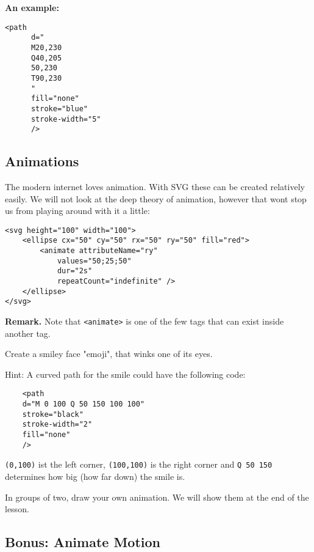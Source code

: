 \documentclass[english,11pt,a4paper]{report}
\begin{document}
{\bf An example:}
\begin{multicols}{2}
\begin{lstlisting}
<path 
      d="
      M20,230 
      Q40,205 
      50,230 
      T90,230
      " 
      fill="none" 
      stroke="blue" 
      stroke-width="5"
      />
\end{lstlisting}
\columnbreak

\end{multicols}

\newpage
\subsection{Animations}
The modern internet loves animation. With SVG these can be created relatively easily. We will not look at the deep theory of animation, however that wont stop us from playing around with it a little:

\begin{lstlisting}
<svg height="100" width="100">
    <ellipse cx="50" cy="50" rx="50" ry="50" fill="red">
        <animate attributeName="ry"
            values="50;25;50"
            dur="2s"
            repeatCount="indefinite" />
    </ellipse>
</svg>
\end{lstlisting}

{\bf Remark.} Note that \verb|<animate>| is one of the few tags that can exist inside another tag.

\begin{ex}
Create a smiley face "emoji", that winks one of its eyes.

Hint: A curved path for the smile could have the following code:
\begin{lstlisting}
    <path 
    d="M 0 100 Q 50 150 100 100" 
    stroke="black" 
    stroke-width="2" 
    fill="none"
    />
\end{lstlisting}
\verb|(0,100)| ist the left corner, \verb|(100,100)| is the right corner and \verb|Q 50 150| determines how big (how far down) the smile is.
\end{ex}

\begin{ex}
In groups of two, draw your own animation. We will show them at the end of the lesson.
\end{ex}

\newpage
\subsection{Bonus: Animate Motion}
\end{document}
